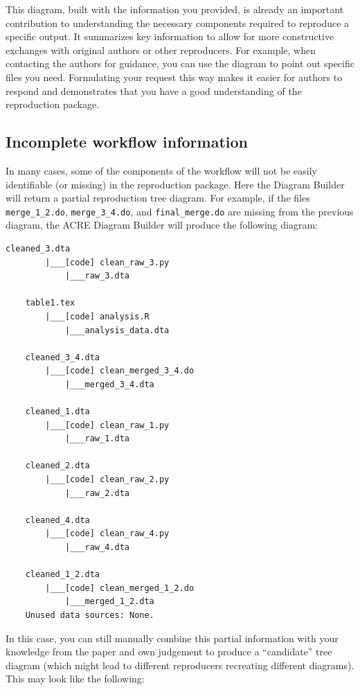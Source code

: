 \documentclass[]{book}
\begin{document}
This diagram, built with the information you provided, is already an important contribution to understanding the necessary components required to reproduce a specific output. It summarizes key information to allow for more constructive exchanges with original authors or other reproducers. For example, when contacting the authors for guidance, you can use the diagram to point out specific files you need. Formulating your request this way makes it easier for authors to respond and demonstrates that you have a good understanding of the reproduction package.

\hypertarget{incomplete-workflow-information}{%
\subsection{Incomplete workflow information}\label{incomplete-workflow-information}}

In many cases, some of the components of the workflow will not be easily identifiable (or missing) in the reproduction package. Here the Diagram Builder will return a partial reproduction tree diagram. For example, if the files \texttt{merge\_1\_2.do}, \texttt{merge\_3\_4.do}, and \texttt{final\_merge.do} are missing from the previous diagram, the ACRE Diagram Builder will produce the following diagram:

\begin{verbatim}
cleaned_3.dta
        |___[code] clean_raw_3.py
            |___raw_3.dta

    table1.tex
        |___[code] analysis.R
            |___analysis_data.dta

    cleaned_3_4.dta
        |___[code] clean_merged_3_4.do
            |___merged_3_4.dta

    cleaned_1.dta
        |___[code] clean_raw_1.py
            |___raw_1.dta

    cleaned_2.dta
        |___[code] clean_raw_2.py
            |___raw_2.dta

    cleaned_4.dta
        |___[code] clean_raw_4.py
            |___raw_4.dta

    cleaned_1_2.dta
        |___[code] clean_merged_1_2.do
            |___merged_1_2.dta
    Unused data sources: None.
\end{verbatim}

In this case, you can still manually combine this partial information with your knowledge from the paper and own judgement to produce a ``candidate'' tree diagram (which might lead to different reproducers recreating different diagrams). This may look like the following:
\end{document}
